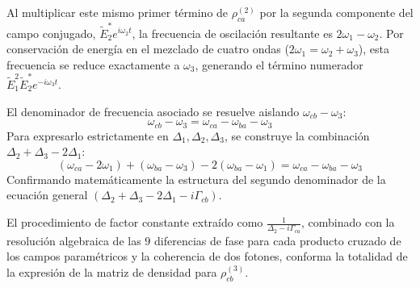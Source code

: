 \documentclass[12pt,a4paper]{article}
\begin{document}
Al multiplicar este mismo primer término de $\rho_{ca}^{(2)}$ por la segunda componente del campo conjugado, $\tilde{E}_2^* e^{i\omega_2 t}$, la frecuencia de oscilación resultante es $2\omega_1 - \omega_2$. Por conservación de energía en el mezclado de cuatro ondas ($2\omega_1 = \omega_2 + \omega_3$), esta frecuencia se reduce exactamente a $\omega_3$, generando el término numerador $\tilde{E}_1^2 \tilde{E}_2^* e^{-i\omega_3 t}$.

El denominador de frecuencia asociado se resuelve aislando $\omega_{cb} - \omega_3$:
\begin{equation}
\omega_{cb} - \omega_3 = \omega_{ca} - \omega_{ba} - \omega_3
\end{equation}
Para expresarlo estrictamente en $\Delta_1, \Delta_2, \Delta_3$, se construye la combinación $\Delta_2 + \Delta_3 - 2\Delta_1$:
\begin{equation}
(\omega_{ca} - 2\omega_1) + (\omega_{ba} - \omega_3) - 2(\omega_{ba} - \omega_1) = \omega_{ca} - \omega_{ba} - \omega_3
\end{equation}
Confirmando matemáticamente la estructura del segundo denominador de la ecuación general $(\Delta_2 + \Delta_3 - 2\Delta_1 - i\Gamma_{cb})$.

El procedimiento de factor constante extraído como $\frac{1}{\Delta_2 - i\Gamma_{ca}}$, combinado con la resolución algebraica de las $9$ diferencias de fase para cada producto cruzado de los campos paramétricos y la coherencia de dos fotones, conforma la totalidad de la expresión de la matriz de densidad para $\rho_{cb}^{(3)}$.
\end{document}
